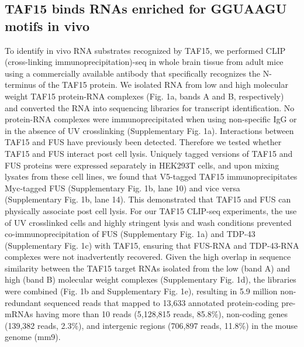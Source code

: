 \subsection{TAF15 binds RNAs enriched for GGUAAGU motifs in vivo}
To identify in vivo RNA substrates recognized by TAF15, we performed CLIP (cross-linking immunoprecipitation)-seq in whole brain tissue from adult mice using a commercially available antibody that specifically recognizes the N-terminus of the TAF15 protein. We isolated RNA from low and high molecular weight TAF15 protein-RNA complexes (Fig. 1a, bands A and B, respectively) and converted the RNA into sequencing libraries for transcript identification. No protein-RNA complexes were immunoprecipitated when using non-specific IgG or in the absence of UV crosslinking (Supplementary Fig. 1a). Interactions between TAF15 and FUS have previously been detected\cite{Thomsen2013,Sun2015}. Therefore we tested whether TAF15 and FUS interact post cell lysis. Uniquely tagged versions of TAF15 and FUS proteins were expressed separately in HEK293T cells, and upon mixing lysates from these cell lines, we found that V5-tagged TAF15 immunoprecipitates Myc-tagged FUS (Supplementary Fig. 1b, lane 10) and vice versa (Supplementary Fig. 1b, lane 14). This demonstrated that TAF15 and FUS can physically associate post cell lysis. For our TAF15 CLIP-seq experiments, the use of UV crosslinked cells and highly stringent lysis and wash conditions prevented co-immunoprecipitation of FUS (Supplementary Fig. 1a) and TDP-43 (Supplementary Fig. 1c) with TAF15, ensuring that FUS-RNA and TDP-43-RNA complexes were not inadvertently recovered. Given the high overlap in sequence similarity between the TAF15 target RNAs isolated from the low (band A) and high (band B) molecular weight complexes (Supplementary Fig. 1d), the libraries were combined (Fig. 1b and Supplementary  Fig. 1e), resulting in 5.9 million non-redundant sequenced reads that mapped to 13,633 annotated protein-coding pre-mRNAs having more than 10 reads (5,128,815 reads, 85.8\%), non-coding genes (139,382 reads, 2.3\%), and intergenic regions (706,897 reads, 11.8\%) in the mouse genome (mm9).



